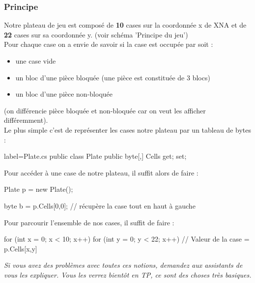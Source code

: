 \documentclass[a4paper]{article}
\begin{document}
\subsubsection{Principe}

Notre plateau de jeu est composé de \textbf{10} cases sur la coordonnée x de
XNA et de \textbf{22} cases sur sa coordonnée y. (voir schéma 'Principe du jeu')\\
Pour chaque case on a envie de savoir si la case est occupée par soit :

\begin{itemize}
    \item une case vide
    \item un bloc d'une pièce bloquée (une pièce est constituée de 3 blocs)
    \item un bloc d'une pièce non-bloquée
\end{itemize}

(on différencie pièce bloquée et non-bloquée car on veut les afficher
différemment). \\

Le plus simple c'est de représenter les cases notre plateau par un tableau de
bytes : \\

\begin{csharpcode*}{label=Plate.cs}
public class Plate
{
    public byte[,] Cells { get; set; }
}
\end{csharpcode*}

Pour accéder à une case de notre plateau, il suffit alors de faire : \\

\begin{csharpcode}
Plate p = new Plate();

byte b = p.Cells[0,0]; // récupère la case tout en haut à gauche
\end{csharpcode}

Pour parcourir l'ensemble de nos cases, il suffit de faire : \\

\begin{csharpcode}
for (int x = 0; x < 10; x++)
{
    for (int y = 0; y < 22; x++)
    {
        // Valeur de la case =  p.Cells[x,y]
    }
}
\end{csharpcode}

\vspace{0.2cm}

\noindent\emph{\color{toogyblue} Si vous avez des problèmes avec toutes ces notions,
demandez aux assistants de vous les expliquer. Vous les verrez bientôt en TP,
ce sont des choses très basiques.} \\
\end{document}
